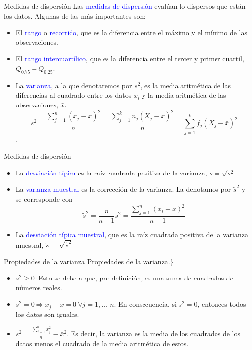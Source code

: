 \documentclass[
  ignorenonframetext,
]{beamer}
\providecommand{\tightlist}{%
  \setlength{\itemsep}{0pt}\setlength{\parskip}{0pt}}
\newcommand\blue[1]{\textcolor{blue}{#1}}
\begin{document}
\begin{frame}{Medidas de dispersión}
\label{medidas-de-dispersiuxf3n-1}
Las \blue{medidas de dispersión} evalúan lo dispersos que están los
datos. Algunas de las más importantes son:

\begin{itemize}
\item
  El \blue{rango} o \blue{recorrido}, que es la diferencia entre el
  máximo y el mínimo de las observaciones.
\item
  El \blue{rango intercuartílico}, que es la diferencia entre el tercer
  y primer cuartil, \(Q_{0.75}-Q_{0.25}\).
\item
  La \blue{varianza}, a la que denotaremos por \(s^2\), es la media
  aritmética de las diferencias al cuadrado entre los datos \(x_i\) y la
  media aritmética de las observaciones, \(\bar{x}\).
  \[s^2 = \frac{\sum_{j=1}^n(x_j-\bar{x})^2}{n}=\frac{\sum_{j=1}^kn_j(X_j-\bar{x})^2}{n}=\sum_{j=1}^kf_j(X_j-\bar{x})^2\].
\end{itemize}
\end{frame}

\begin{frame}{Medidas de dispersión}
\label{medidas-de-dispersiuxf3n-2}
\begin{itemize}
\item
  La \blue{desviación típica} es la raíz cuadrada positiva de la
  varianza, \(s=\sqrt{s^2}\).
\item
  La \blue{varianza muestral} es la corrección de la varianza. La
  denotamos por \(\tilde{s}^2\) y se corresponde con
  \[\tilde{s}^2 = \frac{n}{n-1}s^2 = \frac{\sum_{j=1}^n(x_i-\bar{x})^2}{n-1}\]
\item
  La \blue{desviación típica muestral}, que es la raíz cuadrada positiva
  de la varianza muestral, \(\tilde{s} = \sqrt{\tilde{s}^2}\)
\end{itemize}
\end{frame}

\begin{frame}{Propiedades de la varianza}
\label{propiedades-de-la-varianza}
Propiedades de la varianza.\}

\begin{itemize}
\tightlist
\item
  \(s^2\ge 0\). Esto se debe a que, por definición, es una suma de
  cuadrados de números reales.
\item
  \(s^2 = 0\Longrightarrow x_j-\bar{x}=0\ \forall j= 1,\dots,n\). En
  consecuencia, si \(s^2=0\), entonces todos los datos son iguales.
\item
  \(s^2 =\frac{\sum_{j=1}^nx_j^2}{n}-\bar{x}^2\). Es decir, la varianza
  es la media de los cuadrados de los datos menos el cuadrado de la
  media aritmética de estos.
\end{itemize}
\end{frame}
\end{document}
